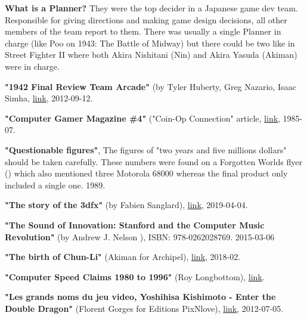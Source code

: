\renewcommand{\bibname}{Notes \&\ References}
\begin{thebibliography}{999}


\textbf{What is a Planner?}
They were the top decider in a Japanese game dev team. Responsible for giving directions and making game design decisions, all other members of the team report to them. There was usually a single Planner in charge (like Poo on 1943: The Battle of Midway) but there could be two like in Street Fighter II where both Akira Nishitani (Nin) and Akira Yasuda (Akiman) were in charge. 

  \textbf{ "1942 Final Review Team Arcade"} (by Tyler Huberty, Greg Nazario, Isaac Simha,
  \href{https://course.ece.cmu.edu/~ece545/F16/reports/F12_Arcade1942.pdf}{link},
  2012-09-12.


  \textbf{ "Computer Gamer Magazine \#4"} ("Coin-Op Connection" article,
  \href{https://www.youtube.com/watch?v=RxIXilYv0kM}{link},
  1985-07.

  \textbf{"Questionable figures"},
  The figures of "two years and five millions dollars" should be taken carefully. These numbers were found on a Forgotten Worlds flyer (\pageref{fw_flyer}) which also mentioned three Motorola 68000 whereas the final product only included a single one. 
  1989.

  \textbf{ "The story of the 3dfx"} (by Fabien Sanglard),
  \href{https://fabiensanglard.net/3dfx_sst1/index.html}{link},
  2019-04-04.

  \textbf{ "The Sound of Innovation: Stanford and the Computer Music Revolution"} (by Andrew J. Nelson ),
  ISBN: 978-0262028769.
  2015-03-06

  \textbf{ "The birth of Chun-Li"} (Akiman for Archipel),
  \href{https://www.youtube.com/watch?v=RxIXilYv0kM}{link},
  2018-02.

  \textbf{ "Computer Speed Claims 1980 to 1996"} (Roy Longbottom),
  \href{http://www.roylongbottom.org.uk/mips.htm}{link}.

  \textbf{ "Les grands noms du jeu video, Yoshihisa Kishimoto - Enter the Double Dragon"} (Florent Gorges for Editions PixNlove),
  \href{https://www.editionspixnlove.com/les-grands-noms-du-jeu-video/289-yoshihisa-kishimoto-enter-the-double-dragon.html}{link},
  2012-07-05.



\end{thebibliography}
